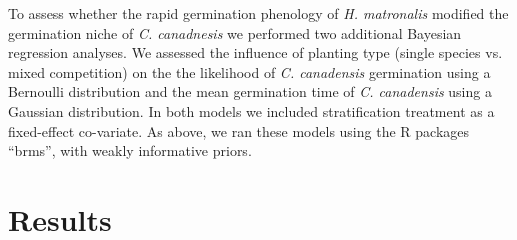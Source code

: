 \documentclass{article}\usepackage[]{graphicx}\usepackage[]{color}
\begin{document}
{To assess whether the rapid germination phenology of \textit{H. matronalis} modified the germination niche of \textit{C. canadnesis} we performed two additional Bayesian  regression analyses. We assessed the influence of planting type (single species vs. mixed competition) on the the likelihood of \textit{C. canadensis} germination using a Bernoulli distribution and the mean germination time of \textit{C. canadensis} using a Gaussian distribution. In both models we included stratification treatment as a fixed-effect co-variate. As above, we ran these models using the R packages ``brms''\citep{Burkner2018},  with weakly informative priors.


\section*{Results}
}
\end{document}
